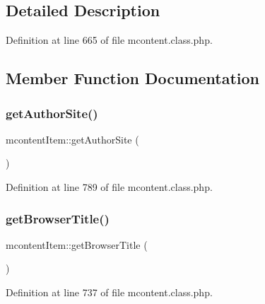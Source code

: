 \subsection{Detailed Description}


Definition at line 665 of file mcontent.\+class.\+php.



\subsection{Member Function Documentation}
\mbox{\label{classmcontentItem_a90fc323e4d3cf2661e6af5e51babd05f}} 
\subsubsection{\texorpdfstring{get\+Author\+Site()}{getAuthorSite()}}
{\footnotesize\ttfamily mcontent\+Item\+::get\+Author\+Site (\begin{DoxyParamCaption}{ }\end{DoxyParamCaption})}



Definition at line 789 of file mcontent.\+class.\+php.

\mbox{\label{classmcontentItem_a6fe964acc2f33039f90a6ed33ae03ba9}} 
\subsubsection{\texorpdfstring{get\+Browser\+Title()}{getBrowserTitle()}}
{\footnotesize\ttfamily mcontent\+Item\+::get\+Browser\+Title (\begin{DoxyParamCaption}{ }\end{DoxyParamCaption})}



Definition at line 737 of file mcontent.\+class.\+php.

\mbox{\label{classmcontentItem_ae8d1d6e76cc1cfa79d544d47acaedbcc}} 
